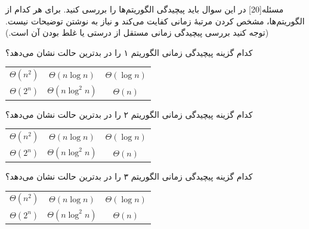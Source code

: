 ‌مسئله[20] در این سوال باید پیچیدگی الگوریتم‌ها را بررسی کنید. برای هر کدام از الگوریتم‌ها، مشخص کردن مرتبۀ زمانی کفایت می‌کند و نیاز به نوشتن توضیحات نیست. (توجه کنید بررسی پیچیدگی زمانی مستقل از درستی یا غلط بودن آن است.)

 کدام گزینه پیچیدگی زمانی الگوریتم ۱
را در بدترین حالت نشان می‌دهد؟
\begin{large}
	\begin{center}
		\begin{tabular}{c c c}
			$\Theta(n^2)$ & $\Theta(n \log n)$ & $\Theta(\log n)$\\
			$\Theta(2^n)$ &	$\Theta(n\log^2 n)$ & $\Theta(n)$\\
		\end{tabular}
	\end{center}
\end{large}
%
%
%
%
%
%


 کدام گزینه پیچیدگی زمانی الگوریتم ۲
را در بدترین حالت نشان می‌دهد؟

\begin{large}
	\begin{center}
		\begin{tabular}{c c c}
			$\Theta(n^2)$ & $\Theta(n \log n)$ & $\Theta(\log n)$\\
			$\Theta(2^n)$ &	$\Theta(n\log^2 n)$ & $\Theta(n)$\\
		\end{tabular}
	\end{center}
\end{large}

%
%
%
%
%
%
%


 کدام گزینه پیچیدگی زمانی الگوریتم ۳
را در بدترین حالت نشان می‌دهد؟
\begin{large}
	\begin{center}
		\begin{tabular}{c c c}
			$\Theta(n^2)$ & $\Theta(n \log n)$ & $\Theta(\log n)$\\
			$\Theta(2^n)$ &	$\Theta(n\log^2 n)$ & $\Theta(n)$\\
		\end{tabular}
	\end{center}
\end{large}
%
%
%
%
%
%
%

